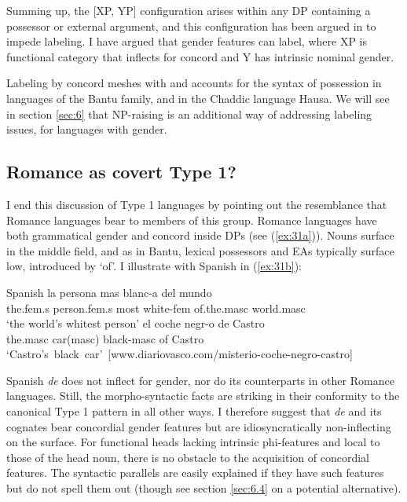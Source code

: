 \documentclass[output=paper
,modfonts
,nonflat]{langsci/langscibook}
\begin{document}
Summing up, the [XP, YP] configuration arises within any DP containing a possessor or external argument, and this configuration has been argued in \citet{Chomsky2013, Chomsky2015} to impede labeling. I have argued that gender features can label, where XP is functional category that inflects for concord and Y has intrinsic nominal gender. 

Labeling by concord meshes with and accounts for the syntax of possession in languages of the Bantu family, and in the Chaddic language Hausa. We will see in section \ref{sec:6} that NP-raising is an additional way of addressing labeling issues, for languages with gender. 

\subsection{Romance as covert Type 1?} \label{sec:3.3}

I end this discussion of Type 1 languages by pointing out the resemblance that Romance languages bear to members of this group. Romance languages have both grammatical gender and concord inside DPs (see (\ref{ex:31a})). Nouns surface in the middle field, and as in Bantu, lexical possessors and EAs typically surface low, introduced by ‘of’. I illustrate with Spanish in (\ref{ex:31b}):

\begin{exe}
	\ex Spanish \label{ex:31}
	\xlist
	\ex \label{ex:31a}
	\gll la           persona       mas   blanc-a      del mundo \\
	the.fem.s   person.fem.s   most white-fem     of.the.masc world.masc\\
	\glt `the world's whitest person'  	
	\ex \label{ex:31b}
	\gll el       coche       negr-o      de Castro \\
	the.masc car(masc)  black-masc  of Castro\\
	\glt \mbox{`Castro's black car' [www.diariovasco.com/misterio-coche-negro-castro]}
	\endxlist
\end{exe}
Spanish \textit{de} does not inflect for gender, nor do its counterparts in other Romance languages. Still, the morpho-syntactic facts are striking in their conformity to the canonical Type 1 pattern in all other ways. I therefore suggest that \textit{de} and its cognates bear concordial gender features but are idiosyncratically non-inflecting on the surface. For functional heads lacking intrinsic phi-features and local to those of the head noun, there is no obstacle to the acquisition of concordial features. The syntactic parallels are easily explained if they have such features but do not spell them out (though see section \ref{sec:6.4} on a potential alternative).       
\end{document}
